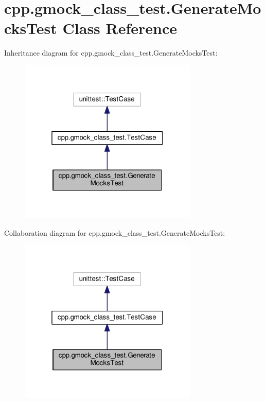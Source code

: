\hypertarget{classcpp_1_1gmock__class__test_1_1GenerateMocksTest}{}\section{cpp.\+gmock\+\_\+class\+\_\+test.\+Generate\+Mocks\+Test Class Reference}
\label{classcpp_1_1gmock__class__test_1_1GenerateMocksTest}


Inheritance diagram for cpp.\+gmock\+\_\+class\+\_\+test.\+Generate\+Mocks\+Test\+:\nopagebreak
\begin{figure}[H]
\begin{center}
\leavevmode
\includegraphics[width=241pt]{classcpp_1_1gmock__class__test_1_1GenerateMocksTest__inherit__graph}
\end{center}
\end{figure}


Collaboration diagram for cpp.\+gmock\+\_\+class\+\_\+test.\+Generate\+Mocks\+Test\+:\nopagebreak
\begin{figure}[H]
\begin{center}
\leavevmode
\includegraphics[width=241pt]{classcpp_1_1gmock__class__test_1_1GenerateMocksTest__coll__graph}
\end{center}
\end{figure}
